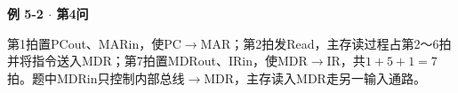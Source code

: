 {\color{ink}\bfseries 例 5-2 \(\cdot \) 第4问}\par\vspace{1bp}第1拍置PCout、MARin，使PC\(\to \)MAR；第2拍发Read，主存读过程占第2～6拍并将指令送入MDR；第7拍置MDRout、IRin，使MDR\(\to \)IR，共\(1+\allowbreak{}5+\allowbreak{}1=\allowbreak{}7\)拍。题中MDRin只控制内部总线\(\to \)MDR，主存读入MDR走另一输入通路。
